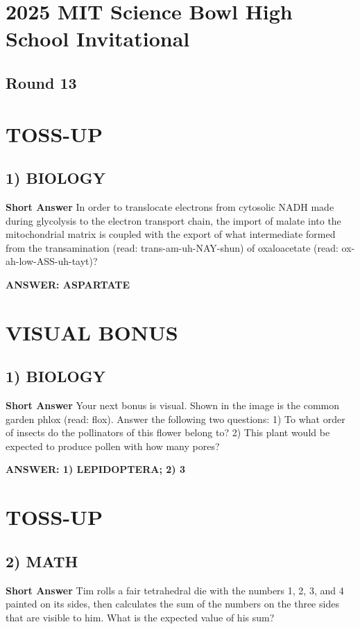 \documentclass{article}
\begin{document}
\section*{2025 MIT Science Bowl High School Invitational}
\subsection*{Round 13}

\section*{TOSS-UP}
\subsection*{1) BIOLOGY}
\textbf{Short Answer}
In order to translocate electrons from cytosolic NADH made during glycolysis to the electron transport chain, the import of malate into the mitochondrial matrix is coupled with the export of what intermediate formed from the transamination (read: trans-am-uh-NAY-shun) of oxaloacetate (read: ox-ah-low-ASS-uh-tayt)?

\textbf{ANSWER: ASPARTATE}

\section*{VISUAL BONUS}
\subsection*{1) BIOLOGY}
\textbf{Short Answer} Your next bonus is visual. Shown in the image is the common garden phlox (read: flox).
Answer the following two questions: 
1) To what order of insects do the pollinators of this flower belong to?
2) This plant would be expected to produce pollen with how many pores?

\textbf{ANSWER: 1) LEPIDOPTERA; 2) 3}

\section*{TOSS-UP}
\subsection*{2) MATH}
\textbf{Short Answer} Tim rolls a fair tetrahedral die with the numbers 1, 2, 3, and 4 painted on its sides, then calculates the sum of the numbers on the three sides that are visible to him.
What is the expected value of his sum?
\end{document}
